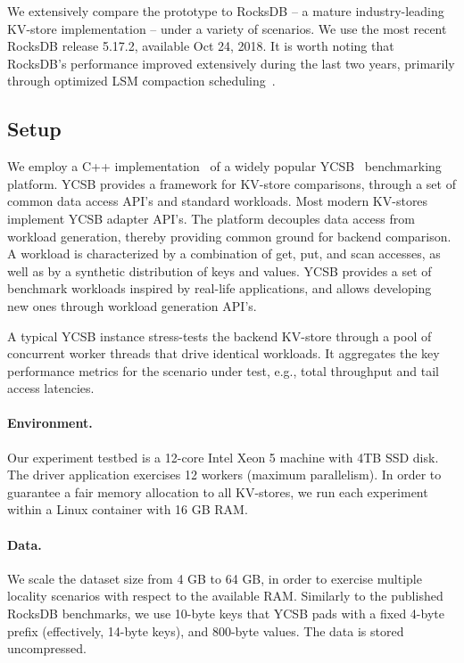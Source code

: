 We extensively compare the \sys\/ prototype to RocksDB -- a mature industry-leading KV-store implementation  -- under a variety of scenarios.  We use the most recent RocksDB release 5.17.2, available Oct 24, 2018.  
It is worth noting that RocksDB's performance improved extensively during the last two years, primarily through 
optimized LSM compaction scheduling~\cite{RocksDBProgress}.   

\subsection{Setup}
We employ a C++ implementation~\cite{Cpp-YCSB} of a widely popular YCSB~\cite{YCSB} benchmarking platform. 
YCSB provides a framework for KV-store comparisons, through a set of common data access API's and standard workloads. 
Most modern KV-stores implement  YCSB adapter API's. The platform decouples data access from workload generation, 
thereby providing common ground for backend comparison. A workload is characterized by a combination of get, put, 
and scan accesses, as well as by a synthetic distribution of keys and values. YCSB provides a set of benchmark workloads
inspired by real-life applications, and allows developing new ones through workload generation API's. 

A typical YCSB instance stress-tests the backend KV-store through a pool of concurrent worker threads that drive identical
workloads. It aggregates the key performance metrics for the scenario under test, e.g., total throughput and tail access latencies. 

\paragraph{Environment.}
Our experiment testbed is a 12-core Intel Xeon 5 machine with 4TB SSD disk. The driver application exercises 12 workers 
(maximum parallelism). In order to guarantee a fair memory allocation to all KV-stores, we run each experiment within 
a Linux container with 16 GB RAM. 

\paragraph{Data.} We scale the dataset size from 4 GB to 64 GB, in order to exercise multiple locality 
scenarios with respect to the available RAM. Similarly to the published RocksDB benchmarks, we use 
10-byte keys that YCSB pads with a fixed 4-byte prefix (effectively, 14-byte keys), and 800-byte values. 
The data is stored uncompressed. 

